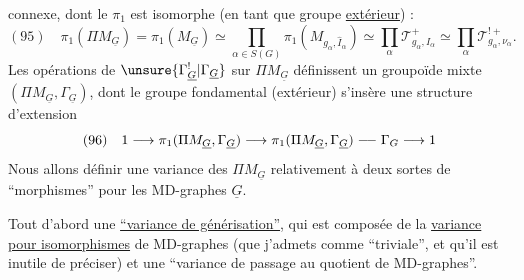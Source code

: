 connexe, dont le $\pi_1$ est isomorphe (en tant que groupe \uline{extérieur}) :
\[
(95)\quad\pi_1(\Pi M_{\underline G})=\pi_1(M_{\underline G})\simeq\prod_{\alpha\in S(G)}\pi_1(M_{g_\alpha,\widehat I_\alpha})\simeq\prod_\alpha\mathcal T^+_{g_\alpha,I_\alpha}\simeq\prod_\alpha\mathcal T^{!+}_{g_\alpha,\nu_\alpha}.
\]
Les opérations de $\unsure{\Gamma^{!}_{\underline G}|\Gamma_{\underline G}}$ sur $\Pi M_{\underline G}$ définissent un groupoïde mixte $(\Pi M_{\underline G},\Gamma_{\underline G})$, dont le groupe fondamental (extérieur) s'insère   une structure d'extension
\[
(96)\quad1\longrightarrow\pi_1(\Pi M_{\underline G},\Gamma_{\underline G})\longrightarrow\pi_1(\Pi M_{\underline G},\Gamma_{\underline G})\relbar\joinrel\relbar\Gamma_G\longrightarrow1
\]
Nous allons définir une  variance des $\Pi M_{\underline G}$ relativement à deux sortes de ``morphismes'' pour les MD-graphes $\underline G$. 

Tout d'abord une \uline{``variance de générisation''}, qui est composée de la \uline{variance pour isomorphismes} de MD-graphes (que j'admets comme ``triviale'', et qu'il est inutile de préciser) et une ``variance de passage au quotient de MD-graphes''.
